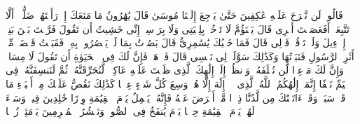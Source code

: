 \stopbuffer%
\startbuffer[\q:20:91]
قَالُوا۟ لَن نَّبۡرَحَ عَلَیۡهِ عَٰكِفِینَ حَتَّىٰ یَرۡجِعَ إِلَیۡنَا مُوسَىٰ%
\stopbuffer%
\startbuffer[\q:20:92]
قَالَ یَٰهَٰرُونُ مَا مَنَعَكَ إِذۡ رَأَیۡتَهُمۡ ضَلُّوۤا۟%
\stopbuffer%
\startbuffer[\q:20:93]
أَلَّا تَتَّبِعَنِۖ أَفَعَصَیۡتَ أَمۡرِی%
\stopbuffer%
\startbuffer[\q:20:94]
قَالَ یَبۡنَؤُمَّ لَا تَأۡخُذۡ بِلِحۡیَتِی وَلَا بِرَأۡسِیۤۖ إِنِّی خَشِیتُ أَن تَقُولَ فَرَّقۡتَ بَیۡنَ بَنِیۤ إِسۡرَٰۤءِیلَ وَلَمۡ تَرۡقُبۡ قَوۡلِی%
\stopbuffer%
\startbuffer[\q:20:95]
قَالَ فَمَا خَطۡبُكَ یَٰسَٰمِرِیُّ%
\stopbuffer%
\startbuffer[\q:20:96]
قَالَ بَصُرۡتُ بِمَا لَمۡ یَبۡصُرُوا۟ بِهِۦ فَقَبَضۡتُ قَبۡضَةࣰ مِّنۡ أَثَرِ ٱلرَّسُولِ فَنَبَذۡتُهَا وَكَذَٰلِكَ سَوَّلَتۡ لِی نَفۡسِی%
\stopbuffer%
\startbuffer[\q:20:97]
قَالَ فَٱذۡهَبۡ فَإِنَّ لَكَ فِی ٱلۡحَیَوٰةِ أَن تَقُولَ لَا مِسَاسَۖ وَإِنَّ لَكَ مَوۡعِدࣰا لَّن تُخۡلَفَهُۥۖ وَٱنظُرۡ إِلَىٰۤ إِلَٰهِكَ ٱلَّذِی ظَلۡتَ عَلَیۡهِ عَاكِفࣰاۖ لَّنُحَرِّقَنَّهُۥ ثُمَّ لَنَنسِفَنَّهُۥ فِی ٱلۡیَمِّ نَسۡفًا%
\stopbuffer%
\startbuffer[\q:20:98]
إِنَّمَاۤ إِلَٰهُكُمُ ٱللَّهُ ٱلَّذِی لَاۤ إِلَٰهَ إِلَّا هُوَۚ وَسِعَ كُلَّ شَیۡءٍ عِلۡمࣰا%
\stopbuffer%
\startbuffer[\q:20:99]
كَذَٰلِكَ نَقُصُّ عَلَیۡكَ مِنۡ أَنۢبَاۤءِ مَا قَدۡ سَبَقَۚ وَقَدۡ ءَاتَیۡنَٰكَ مِن لَّدُنَّا ذِكۡرࣰا%
\stopbuffer%
\startbuffer[\q:20:100]
مَّنۡ أَعۡرَضَ عَنۡهُ فَإِنَّهُۥ یَحۡمِلُ یَوۡمَ ٱلۡقِیَٰمَةِ وِزۡرًا%
\stopbuffer%
\startbuffer[\q:20:101]
خَٰلِدِینَ فِیهِۖ وَسَاۤءَ لَهُمۡ یَوۡمَ ٱلۡقِیَٰمَةِ حِمۡلࣰا%
\stopbuffer%
\startbuffer[\q:20:102]
یَوۡمَ یُنفَخُ فِی ٱلصُّورِۚ وَنَحۡشُرُ ٱلۡمُجۡرِمِینَ یَوۡمَئِذࣲ زُرۡقࣰا%
\stopbuffer%

